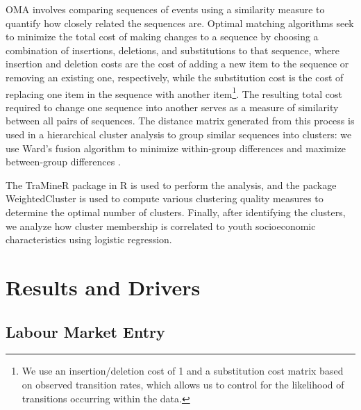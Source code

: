 \documentclass[
  a4paper, twoside, 12pt]{book}
\begin{document}
OMA involves comparing sequences of events using a similarity measure to quantify how closely related the sequences are. Optimal matching algorithms seek to minimize the total cost of making changes to a sequence by choosing a combination of insertions, deletions, and substitutions to that sequence, where insertion and deletion costs are the cost of adding a new item to the sequence or removing an existing one, respectively, while the substitution cost is the cost of replacing one item in the sequence with another item\footnote{We use an insertion/deletion cost of 1 and a substitution cost matrix based on observed transition rates, which allows us to control for the likelihood of transitions occurring within the data.}. The resulting total cost required to change one sequence into another serves as a measure of similarity between all pairs of sequences. The distance matrix generated from this process is used in a hierarchical cluster analysis to group similar sequences into clusters: we use Ward's fusion algorithm to minimize within-group differences and maximize between-group differences \autocite{dlouhy2015,achatz2022}.

The TraMineR package in R \autocite{gabadinho2011} is used to perform the analysis, and the package WeightedCluster \autocite{studer2013} is used to compute various clustering quality measures to determine the optimal number of clusters. Finally, after identifying the clusters, we analyze how cluster membership is correlated to youth socioeconomic characteristics using logistic regression.

\hypertarget{survey-results}{%
\section{Results and Drivers}\label{survey-results}}

\hypertarget{survey-entry}{%
\subsection{Labour Market Entry}\label{survey-entry}}
\end{document}
